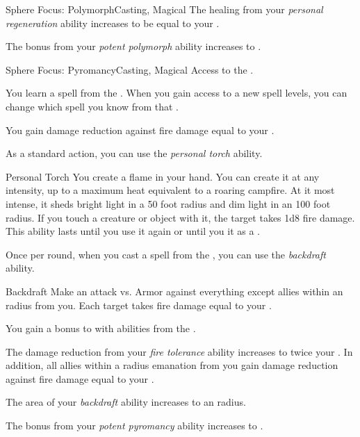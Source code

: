 \begin{feat}{Sphere Focus: Polymorph}{Casting, Magical}
         The healing from your \textit{personal regeneration} ability increases to be equal to your .

         The bonus from your \textit{potent polymorph} ability increases to .
    \end{feat}

    \begin{feat}{Sphere Focus: Pyromancy}{Casting, Magical}
        \featpre Access to the  .

         You learn a spell from the  .
        When you gain access to a new spell levels, you can change which spell you know from that .

         You gain damage reduction against fire damage equal to your .

         As a standard action, you can use the \textit{personal torch} ability.
        \begin{ability}{Personal Torch}
            You create a flame in your hand.
            You can create it at any intensity, up to a maximum heat equivalent to a roaring campfire.
            At it most intense, it sheds bright light in a 50 foot radius and dim light in an 100 foot radius.
            If you touch a creature or object with it, the target takes 1d8 fire damage.
            This ability lasts until you use it again or until you  it as a .
        \end{ability}

         Once per round, when you cast a spell from the  , you can use the \textit{backdraft} ability.
        \begin{ability}{Backdraft}
            Make an attack vs. Armor against everything except allies within an \areasmall radius from you.
            \hit Each target takes fire damage equal to your .
        \end{ability}

         You gain a  bonus to  with abilities from the  .

         The damage reduction from your \textit{fire tolerance} ability increases to twice your .
        In addition, all allies within a \areamed radius emanation from you gain damage reduction against fire damage equal to your .

         The area of your \textit{backdraft} ability increases to an \areamed radius.

         The bonus from your \textit{potent pyromancy} ability increases to .
    \end{feat}

